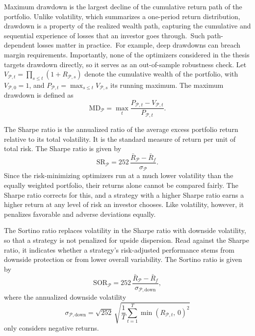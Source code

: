 Maximum drawdown is the largest decline of the cumulative return
path of the portfolio. Unlike volatility,
which summarizes a one-period return distribution, drawdown is a property of the
realized wealth path, capturing the cumulative and sequential experience of losses
that an investor goes through.\ Such path-dependent losses matter
in practice.\ For example, deep drawdowns can breach margin requirements. 
Importantly, none of the optimizers considered in the thesis targets drawdown
directly, so it serves as an out-of-sample robustness check. Let $V_{\mathcal{P},t} = \prod_{s \le t}(1 + R_{\mathcal P,s})$ denote
the cumulative wealth of the portfolio, with $V_{\mathcal{P},0} = 1$, and $P_{\mathcal{P},t} = \max_{s \le t} V_{\mathcal{P},s}$ its running
maximum. The maximum drawdown is defined as
\begin{equation*}
\mathrm{MD_{\mathcal P}} = \max_{t} \frac{P_{\mathcal P,t} - V_{\mathcal P,t}}{P_{\mathcal P,t}}.
\end{equation*}

The Sharpe ratio is the annualized ratio of the average excess portfolio return
relative to its total volatility. It is the standard measure of return per unit of
total risk. The Sharpe ratio is given by
\begin{equation*}
\mathrm{SR}_{\mathcal P} = 252\,
\frac{\bar{R}_{\mathcal P} - \bar R_f}{\sigma_{\mathcal P}}.
\end{equation*}
Since the risk-minimizing optimizers run at a much lower volatility than the equally weighted
portfolio, their returns alone cannot be compared fairly. The Sharpe ratio corrects
for this, and a strategy with a higher Sharpe ratio earns a higher return
at any level of risk an investor chooses. Like volatility, however, it penalizes
favorable and adverse deviations equally.

The Sortino ratio replaces volatility in the Sharpe ratio with downside volatility,
so that a strategy is not penalized for upside dispersion. Read against the Sharpe
ratio, it indicates whether a strategy's risk-adjusted performance stems from downside
protection or from lower overall variability. The Sortino ratio is given by
\begin{equation*}
\mathrm{SOR}_{\mathcal P} = 252\,\frac{\bar R_{\mathcal P} - \bar R_f}{\sigma_{\mathcal P, \text{down}}},
\end{equation*}
where the annualized downside volatility
\begin{equation*}
\sigma_{\mathcal P,\text{down}} = \sqrt{252}\,\sqrt{\frac{1}{T}\sum_{t=1}^{T}
\min\left(R_{\mathcal P,t},\, 0\right)^2}
\end{equation*}
only considers negative returns. 

